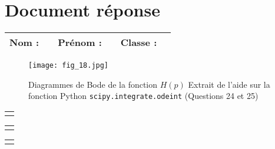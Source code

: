\newpage
\section*{Document réponse}
\begin{center}
\begin{tabular}{p{}p{}|p{}p{}|p{}p{}}
\textbf{Nom : } & &
\textbf{Prénom : } &  &
\textbf{Classe : } &  \\
\hline
\end{tabular}
\end{center}

\begin{figure}[H]
\centering
\texttt{[image: fig\_18.jpg]}
\caption{\label{fig:C} Diagrammes de Bode de la fonction $H(p)$ Extrait de l'aide sur la fonction Python \texttt{scipy.integrate.odeint} (Questions 24 et 25)}
\end{figure}


\fi

\newpage

\begin{tabular}{p{}}
\\
\hline
\\
\end{tabular}

\newpage

\begin{tabular}{p{}}
\\
\hline
\\
\end{tabular}

\newpage

\begin{tabular}{p{}}
\\
\hline
\\
\end{tabular}